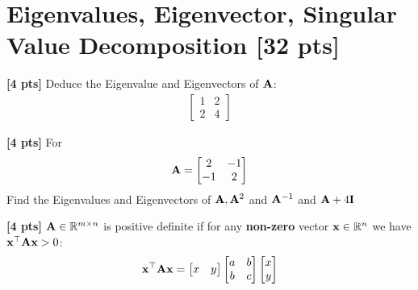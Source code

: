 \documentclass[11pt,addpoints,answers]{exam}
\numberwithin{equation}{section} %
\numberwithin{figure}{section} %
\numberwithin{table}{section} %
\begin{document}
\section{Eigenvalues, Eigenvector, Singular Value Decomposition [32 pts]}
\begin{questions}
    \question \textbf{[4 pts]}  Deduce the Eigenvalue and Eigenvectors of $\mathbf{A}$:
    \begin{align*}
        \begin{bmatrix}
            1 & 2 \\ 2 & 4
        \end{bmatrix}
    \end{align*}
    \begin{tcolorbox}[fit,height=7cm, width=\textwidth, blank, borderline={0.5pt}{-2pt},halign=center, valign=center, nobeforeafter]
    \end{tcolorbox}

    \question \textbf{[4 pts]}   For
    \begin{align*}
         \mathbf{A} = \begin{bmatrix}
             2 & -1 \\ -1 & 2
         \end{bmatrix}
     \end{align*}
     Find the Eigenvalues and Eigenvectors of $\mathbf{A}, \mathbf{A}^2$ and $\mathbf{A}^{-1}$ and $\mathbf{A} + 4\mathbf{I}$

    \begin{tcolorbox}[fit,height=10cm, width=\textwidth, blank, borderline={0.5pt}{-2pt},halign=center, valign=center, nobeforeafter]
    \end{tcolorbox}

    \question \textbf{[4 pts]}  $\mathbf{A} \in \mathbb{R}^{m \times n}$ is positive definite if for any \textbf{non-zero} vector $\mathbf{x} \in \mathbb{R}^{n}$  we have $\mathbf{x}^\top \mathbf{A} \mathbf{x} > 0$:
    \begin{align*}
        \mathbf{x}^\top \mathbf{A} \mathbf{x} = \begin{bmatrix}
            x & y
        \end{bmatrix} \begin{bmatrix}
            a & b \\ b & c
        \end{bmatrix}
        \begin{bmatrix}
            x \\ y
        \end{bmatrix}
    \end{align*}


\end{questions}
\end{document}
